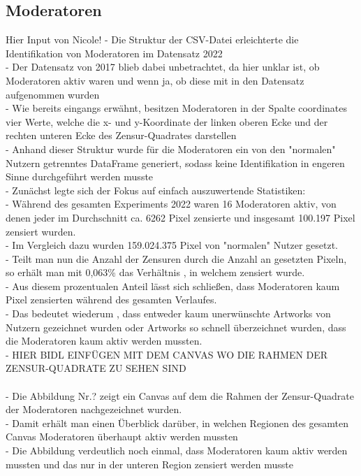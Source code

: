 {\subsection{Moderatoren}
Hier Input von Nicole!
- Die Struktur der CSV-Datei erleichterte die Identifikation von Moderatoren im Datensatz 2022 \\
- Der Datensatz von 2017 blieb dabei unbetrachtet, da hier unklar ist, ob Moderatoren aktiv waren und wenn ja, ob diese mit in den Datensatz aufgenommen wurden \\
- Wie bereits eingangs erwähnt, besitzen Moderatoren in der Spalte coordinates vier Werte, welche die x- und y-Koordinate der linken oberen Ecke und der rechten unteren Ecke des Zensur-Quadrates darstellen \\
- Anhand dieser Struktur wurde für die Moderatoren ein von den "normalen" Nutzern getrenntes DataFrame generiert, sodass keine Identifikation in engeren Sinne durchgeführt werden musste \\
- Zunächst legte sich der Fokus auf einfach auszuwertende Statistiken: \\
- Während des gesamten Experiments 2022 waren 16 Moderatoren aktiv, von denen jeder im Durchschnitt ca. 6262 Pixel zensierte und insgesamt 100.197 Pixel zensiert wurden. \\
- Im Vergleich dazu wurden 159.024.375 Pixel von "normalen" Nutzer gesetzt. \\
- Teilt man nun die Anzahl der Zensuren durch die Anzahl an gesetzten Pixeln, so erhält man mit 0,063\% das Verhältnis , in welchem zensiert wurde. \\
- Aus diesem prozentualen Anteil lässt sich schließen, dass Moderatoren kaum Pixel zensierten während des gesamten Verlaufes. \\
- Das bedeutet wiederum , dass entweder kaum unerwünschte Artworks von Nutzern gezeichnet wurden oder Artworks so schnell überzeichnet wurden, dass die Moderatoren kaum aktiv werden mussten. \\
- HIER BIDL EINFÜGEN MIT DEM CANVAS WO DIE RAHMEN DER ZENSUR-QUADRATE ZU SEHEN SIND \\
\\
- Die Abbildung Nr.? zeigt ein Canvas auf dem die Rahmen der Zensur-Quadrate der Moderatoren nachgezeichnet wurden. \\
- Damit erhält man einen Überblick darüber, in welchen Regionen des gesamten Canvas Moderatoren überhaupt aktiv werden mussten \\
- Die Abbildung verdeutlich noch einmal, dass Moderatoren kaum aktiv werden mussten und das nur in der unteren Region zensiert werden musste \\
}
